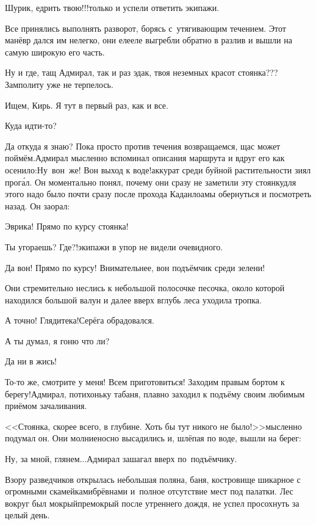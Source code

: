 \diagdash Шурик, едрить твою!!!\mdash только и успели ответить экипажи. 

Все принялись выполнять разворот, борясь с~утягивающим течением. Этот манёвр дался им нелегко, они еле\sdash еле выгребли обратно в разлив и вышли на самую широкую его часть.

\diagdash Ну и где, тащ Адмирал, так и раз эдак, твоя неземных красот стоянка???\mdash Замполиту уже не терпелось.

\diagdash Ищем, Кирь. Я тут в первый раз, как и все.

\diagdash Куда идти-то?

\diagdash Да откуда я знаю? Пока просто против течения возвращаемся, щас может поймём.\mdash Адмирал мысленно вспоминал описания маршрута и вдруг его как осенило:\mdash Ну~вон~же! Вон выход к воде!\mdash аккурат среди буйной растительности зиял прог\'{а}л. Он моментально понял, почему они сразу не заметили эту стоянку\mdash для этого надо было почти сразу после прохода Каданлоамы обернуться и посмотреть назад. Он заорал:

\diagdash Эврика! Прямо по курсу стоянка!

\diagdash Ты угораешь? Где?!\mdash экипажи в упор не видели очевидного.

\diagdash Да вон! Прямо по курсу! Внимательнее, вон подъёмчик среди зелени!

Они стремительно неслись к небольшой полосочке песочка, около которой находился большой валун и далее вверх вглубь леса уходила тропка.

\diagdash А точно! Глядите\sdash ка!\mdash Серёга обрадовался.

\diagdash А ты думал, я гоню что ли?

\diagdash Да ни в жись!

\diagdash То-то же, смотрите у меня! Всем приготовиться! Заходим правым бортом к берегу!\mdash Адмирал, потихоньку табаня, плавно заходил к подъёму своим любимым приёмом зачаливания.

<<Стоянка, скорее всего, в глубине. Хоть бы тут никого не было!>>\mdash мысленно подумал он. Они молниеносно высадились и, шлёпая по воде, вышли на берег:

\diagdash Ну, за мной, глянем$\ldots$\mdash Адмирал зашагал вверх по~подъёмчику.

Взору разведчиков открылась небольшая поляна, баня, костровище шикарное с огромными скамейками\sdash брёвнами и~полное отсутствие мест под палатки. Лес вокруг был мокрый\sdash премокрый после утреннего дождя, не успел просохнуть за целый день.


